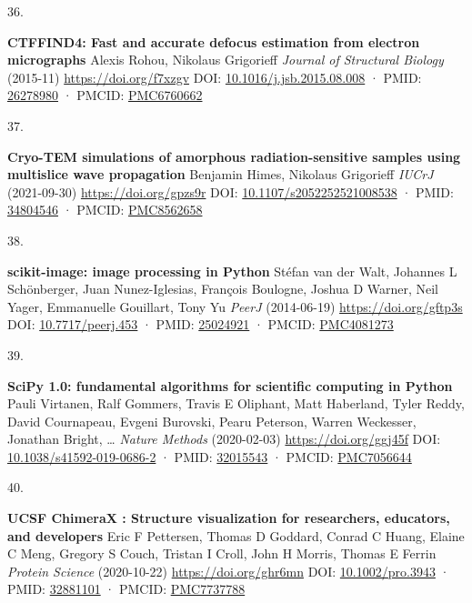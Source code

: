 \documentclass[
]{article}
\newlength{\cslhangindent}
\newlength{\csllabelwidth}
\newlength{\cslentryspacingunit} %
\newenvironment{CSLReferences}[2] %
 {%
  \setlength{\parindent}{0pt}
  \ifodd #1
  \let\oldpar\par
  \def\par{\hangindent=\cslhangindent\oldpar}
  \fi
  \setlength{\parskip}{#2\cslentryspacingunit}
 }%
 {}
\newcommand{\CSLBlock}[1]{#1\hfill\break}
\newcommand{\CSLLeftMargin}[1]{\parbox[t]{\csllabelwidth}{#1}}
\newcommand{\CSLRightInline}[1]{\parbox[t]{\linewidth - \csllabelwidth}{#1}\break}
\begin{document}
\begin{CSLReferences}{0}{0}
\leavevmode{}%
\CSLLeftMargin{36. }%
\CSLRightInline{\textbf{CTFFIND4: Fast and accurate defocus estimation from electron micrographs}
\CSLBlock{Alexis Rohou, Nikolaus Grigorieff} \emph{Journal of Structural Biology} (2015-11) \url{https://doi.org/f7xzgv}
\CSLBlock{DOI: \href{https://doi.org/10.1016/j.jsb.2015.08.008}{10.1016/j.jsb.2015.08.008} · PMID: \href{https://www.ncbi.nlm.nih.gov/pubmed/26278980}{26278980} · PMCID: \href{https://www.ncbi.nlm.nih.gov/pmc/articles/PMC6760662}{PMC6760662}}}

\leavevmode{}%
\CSLLeftMargin{37. }%
\CSLRightInline{\textbf{Cryo-TEM simulations of amorphous radiation-sensitive samples using multislice wave propagation}
\CSLBlock{Benjamin Himes, Nikolaus Grigorieff} \emph{IUCrJ} (2021-09-30) \url{https://doi.org/gpzs9r}
\CSLBlock{DOI: \href{https://doi.org/10.1107/s2052252521008538}{10.1107/s2052252521008538} · PMID: \href{https://www.ncbi.nlm.nih.gov/pubmed/34804546}{34804546} · PMCID: \href{https://www.ncbi.nlm.nih.gov/pmc/articles/PMC8562658}{PMC8562658}}}

\leavevmode{}%
\CSLLeftMargin{38. }%
\CSLRightInline{\textbf{scikit-image: image processing in Python}
\CSLBlock{Stéfan van der Walt, Johannes L Schönberger, Juan Nunez-Iglesias, François Boulogne, Joshua D Warner, Neil Yager, Emmanuelle Gouillart, Tony Yu} \emph{PeerJ} (2014-06-19) \url{https://doi.org/gftp3s}
\CSLBlock{DOI: \href{https://doi.org/10.7717/peerj.453}{10.7717/peerj.453} · PMID: \href{https://www.ncbi.nlm.nih.gov/pubmed/25024921}{25024921} · PMCID: \href{https://www.ncbi.nlm.nih.gov/pmc/articles/PMC4081273}{PMC4081273}}}

\leavevmode{}%
\CSLLeftMargin{39. }%
\CSLRightInline{\textbf{SciPy 1.0: fundamental algorithms for scientific computing in Python}
\CSLBlock{Pauli Virtanen, Ralf Gommers, Travis E Oliphant, Matt Haberland, Tyler Reddy, David Cournapeau, Evgeni Burovski, Pearu Peterson, Warren Weckesser, Jonathan Bright, \ldots{} } \emph{Nature Methods} (2020-02-03) \url{https://doi.org/ggj45f}
\CSLBlock{DOI: \href{https://doi.org/10.1038/s41592-019-0686-2}{10.1038/s41592-019-0686-2} · PMID: \href{https://www.ncbi.nlm.nih.gov/pubmed/32015543}{32015543} · PMCID: \href{https://www.ncbi.nlm.nih.gov/pmc/articles/PMC7056644}{PMC7056644}}}

\leavevmode{}%
\CSLLeftMargin{40. }%
\CSLRightInline{\textbf{UCSF ChimeraX
: Structure visualization for researchers, educators, and developers}
\CSLBlock{Eric F Pettersen, Thomas D Goddard, Conrad C Huang, Elaine C Meng, Gregory S Couch, Tristan I Croll, John H Morris, Thomas E Ferrin} \emph{Protein Science} (2020-10-22) \url{https://doi.org/ghr6mn}
\CSLBlock{DOI: \href{https://doi.org/10.1002/pro.3943}{10.1002/pro.3943} · PMID: \href{https://www.ncbi.nlm.nih.gov/pubmed/32881101}{32881101} · PMCID: \href{https://www.ncbi.nlm.nih.gov/pmc/articles/PMC7737788}{PMC7737788}}}


\end{CSLReferences}
\end{document}
